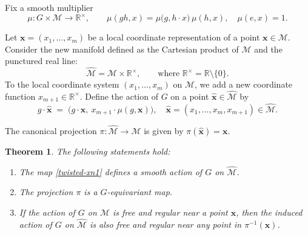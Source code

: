 \documentclass[12pt,reqno]{amsart}
\newtheorem{theorem}{Theorem}
\begin{document}
\medskip

Fix a smooth multiplier
\[
\mu : G \times \mathcal M \to \mathbb{R}^\times, \qquad
\mu(gh,x) = \mu\bigl(g, h \cdot x\bigr)\,\mu(h,x), \quad
\mu(e,x) = 1.
\]

Let $\boldsymbol x = (x_1, \dots, x_m)$ be a local coordinate representation of a point $\boldsymbol x \in \mathcal M$.
Consider the new manifold defined as the Cartesian product of $\mathcal M$ and the punctured real line:
\[
\widehat{\mathcal M} = \mathcal M \times \mathbb{R}^\times, \qquad \text{where } \mathbb{R}^\times = \mathbb{R} \setminus \{0\}.
\]
To the local coordinate system $(x_1, \dots, x_m)$ on $\mathcal M$, we add a new coordinate function $x_{m+1} \in \mathbb{R}^\times$.
Define the action of $G$ on a point $\boldsymbol{\hat x} \in \widehat{\mathcal M}$ by
\begin{equation}\label{twisted-xn1}
g \cdot \boldsymbol{\hat x}
\;=\;
\bigl(g \cdot \boldsymbol x,\ x_{m+1} \cdot \mu(g,\boldsymbol x)\bigr),
\quad
\boldsymbol{\hat x} = (x_1, \dots, x_m, x_{m+1}) \in \widehat{\mathcal M}.
\end{equation}

The canonical projection \(\pi : \widehat{\mathcal M} \to \mathcal M\) is given by \(\pi(\boldsymbol{\hat x}) = \boldsymbol x\).

\begin{theorem}\label{twisted-action}
The following statements hold:
\begin{enumerate}\itemsep=2pt
\item[(\textit{i})] The map \eqref{twisted-xn1} defines a smooth action of $G$ on $\widehat{\mathcal M}$.
\item[(\textit{ii})] The projection $\pi$ is a $G$-equivariant map.
\item[(\textit{iii})] If the action of $G$ on $\mathcal M$ is free and regular near a point $\boldsymbol x$, then the induced action of $G$ on $\widehat{\mathcal M}$ is also free and regular near any point in $\pi^{-1}(\boldsymbol x)$.
\end{enumerate}
\end{theorem}
\end{document}
